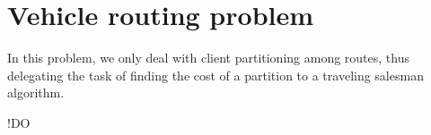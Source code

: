 \section{Vehicle routing problem} \label{algorithm-vrp}
In this problem, we only deal with client partitioning among routes, thus delegating the task of finding the cost of a partition to a traveling salesman algorithm.\par
!DO



